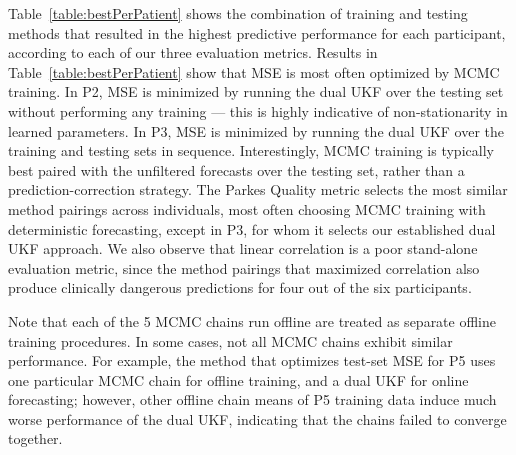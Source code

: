 \documentclass[10pt,letterpaper]{article}
\begin{document}
Table~\ref{table:bestPerPatient} shows the combination of training and testing methods that resulted in the highest predictive performance for each participant, according to each of our three evaluation metrics.
Results in Table~\ref{table:bestPerPatient} show that MSE is most often optimized by MCMC training. In P2, MSE is minimized by running the dual UKF over the testing set without performing any training --- this is highly indicative of non-stationarity in learned parameters. In P3, MSE is minimized by running the dual UKF over the training and testing sets in sequence. Interestingly, MCMC training is typically best paired with the unfiltered forecasts over the testing set, rather than a prediction-correction  strategy.
The Parkes Quality metric selects the most similar method pairings across individuals, most often choosing MCMC training with deterministic forecasting, except in P3, for whom it selects our established dual UKF approach.
We also observe that linear correlation is a poor stand-alone evaluation metric, since the method pairings that maximized correlation also produce clinically dangerous predictions for four out of the six participants. 

Note that each of the 5 MCMC chains run offline are treated as separate offline training procedures. In some cases, not all MCMC chains exhibit similar performance. For example, the method that optimizes test-set MSE for P5 uses one particular MCMC chain for offline training, and a dual UKF for online forecasting; however, other offline chain means of P5 training data induce much worse performance of the dual UKF, indicating that the chains failed to converge together. 
\end{document}
